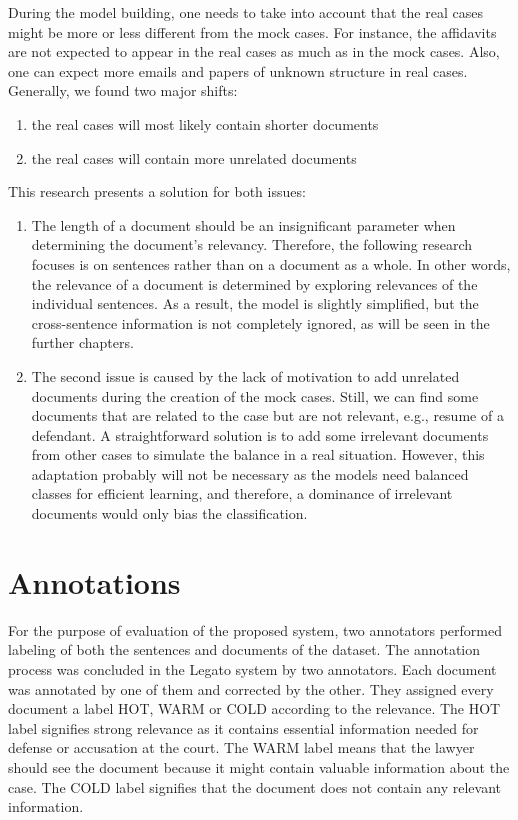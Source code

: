 \documentclass[
  digital, %
  notable,   %
  nolof,     %
  nolot,     %
]{fithesis3}
\begin{document}
During the model building, one needs to take into account that the real cases might be more or less different from the mock cases.
For instance, the affidavits are not expected to appear in the real cases as much as in the mock cases.
Also, one can expect more emails and papers of unknown structure in real cases.
Generally, we found two major shifts: 
\begin{enumerate}
\item the real cases will most likely contain shorter documents
\item the real cases will contain more unrelated documents
\end{enumerate}
This research presents a solution for both issues:
\begin{enumerate}
\item 
The length of a document should be an insignificant parameter when determining the document's relevancy.
Therefore, the following research focuses is on sentences rather than on a document as a whole.
In other words, the relevance of a document is determined by exploring relevances of the individual sentences.
As a result, the model is slightly simplified, but the cross-sentence information is not completely ignored, as will be seen in the further chapters.

\item
The second issue is caused by the lack of motivation to add unrelated documents during the creation of the mock cases.
Still, we can find some documents that are related to the case but are not relevant, e.g., resume of a defendant.
A straightforward solution is to add some irrelevant documents from other cases to simulate the balance in a real situation.
However, this adaptation probably will not be necessary as the models need balanced classes for efficient learning, and therefore, a dominance of irrelevant documents would only bias the classification.

\end{enumerate}

\section{Annotations}
For the purpose of evaluation of the proposed system, two annotators performed labeling of both the sentences and documents of the dataset.
The annotation process was concluded in the Legato system by two annotators.
Each document was annotated by one of them and corrected by the other.
They assigned every document a label HOT, WARM or COLD according to the relevance.
The HOT label signifies strong relevance as it contains essential information needed for defense or accusation at the court.
The WARM label means that the lawyer should see the document because it might contain valuable information about the case.
The COLD label signifies that the document does not contain any relevant information.
\end{document}
